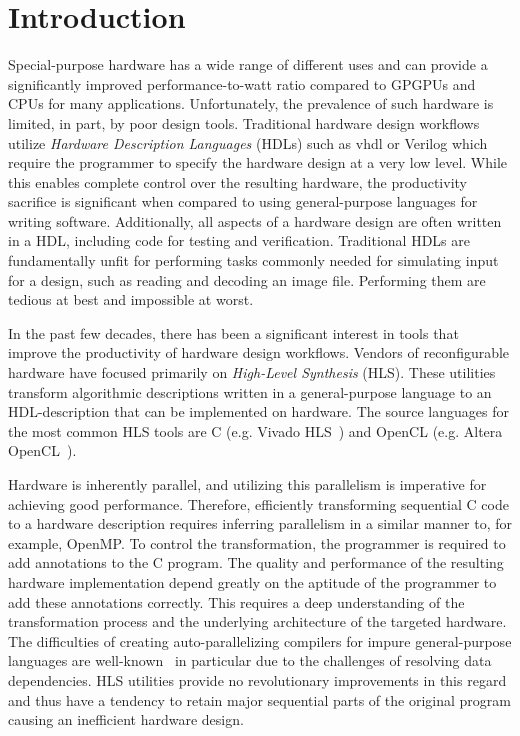 \chapter{Introduction}

Special-purpose hardware has a wide range of different uses and can provide a
significantly improved performance-to-watt ratio compared to GPGPUs and CPUs for
many applications. Unfortunately, the prevalence of such hardware is limited, in
part, by poor design tools. Traditional hardware design workflows utilize
{\itshape Hardware Description Languages} (HDLs) such as \gls{vhdl} or Verilog
which require the programmer to specify the hardware design at a very low
level. While this enables complete control over the resulting hardware, the
productivity sacrifice is significant when compared to using general-purpose
languages for writing software. Additionally, all aspects of a hardware design
are often written in a HDL, including code for testing and
verification. Traditional HDLs are fundamentally unfit for performing tasks
commonly needed for simulating input for a design, such as reading and decoding
an image file. Performing them are tedious at best and impossible at worst.

In the past few decades, there has been a significant interest in tools that
improve the productivity of hardware design workflows. Vendors of reconfigurable
hardware have focused primarily on {\itshape High-Level Synthesis} (HLS). These
utilities transform algorithmic descriptions written in a general-purpose
language to an HDL-description that can be implemented on hardware. The source
languages for the most common HLS tools are C (e.g. Vivado HLS~\cite{vivadohls})
and OpenCL (e.g. Altera OpenCL~\cite{aocl}).

Hardware is inherently parallel, and utilizing this parallelism is imperative
for achieving good performance. Therefore, efficiently transforming sequential C
code to a hardware description requires inferring parallelism in a similar
manner to, for example, OpenMP. To control the transformation, the programmer is
required to add annotations to the C program. The quality and performance of the
resulting hardware implementation depend greatly on the aptitude of the
programmer to add these annotations correctly. This requires a deep
understanding of the transformation process and the underlying architecture of
the targeted hardware. The difficulties of creating auto-parallelizing compilers
for impure general-purpose languages are
well-known~\cite{banerjee1976data,bodik2000abcd} in particular due to the
challenges of resolving data dependencies. HLS utilities provide no
revolutionary improvements in this regard and thus have a tendency to retain
major sequential parts of the original program causing an inefficient hardware
design.


